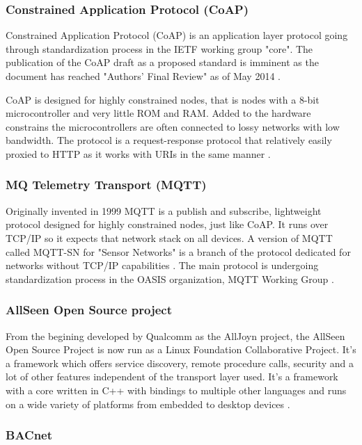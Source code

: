 \subsubsection{Constrained Application Protocol (CoAP)}
Constrained Application Protocol (CoAP) is an application layer protocol
going through standardization process in the IETF working group "core". The
publication of the CoAP draft as a proposed standard is imminent as the
document has reached "Authors' Final Review" as of May 2014 \cite{web:wgcore}.

CoAP is designed for highly constrained nodes, that is nodes with a 8-bit
microcontroller and very little ROM and RAM. Added to the hardware constrains
the microcontrollers are often connected to lossy networks with low bandwidth.
The protocol is a request-response protocol that relatively easily proxied to
HTTP as it works with URIs in the same manner \cite{web:draftcoap}.

\subsubsection{MQ Telemetry Transport (MQTT)}
Originally invented in 1999 MQTT is a publish and subscribe, lightweight
protocol designed for highly constrained nodes, just like CoAP. It runs
over TCP/IP so it expects that network stack on all devices. A version of MQTT
called MQTT-SN for "Sensor Networks" is a branch of the protocol dedicated for
networks without TCP/IP capabilities \cite{web:mqtt,web:mqtt-sn}. The main
protocol is undergoing standardization process in the OASIS organization, MQTT
Working Group \cite{web:oasis-mqtt}.

\subsubsection{AllSeen Open Source project}
From the begining developed by Qualcomm as the AllJoyn project, the AllSeen
Open Source Project is now run as a Linux Foundation Collaborative Project.
It's a framework which offers service discovery, remote procedure calls,
security and a lot of other features independent of the transport layer used.
It's a framework with a core written in C++ with bindings to multiple other
languages and runs on a wide variety of platforms from embedded to desktop
devices \cite{web:alljoyn,web:allseen}.

\subsubsection{BACnet}
